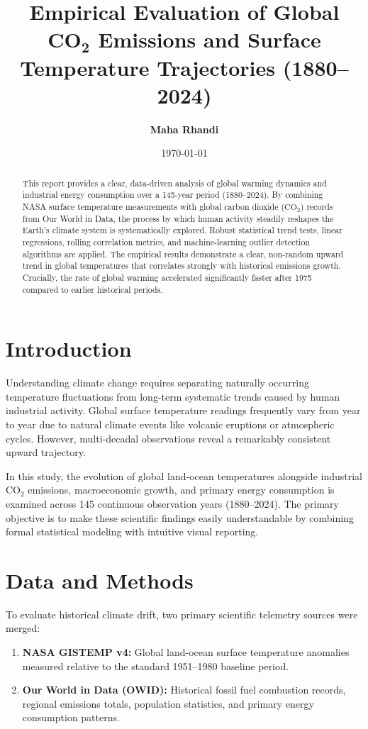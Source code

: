 \documentclass[10pt,twocolumn,3p]{article}
\title{\textbf{Empirical Evaluation of Global $\mathbf{CO_2}$ Emissions and Surface Temperature Trajectories (1880--2024)}}
\author{\textbf{Maha Rhandi}}
\date{\today}
\begin{document}
\maketitle

\begin{abstract}
This report provides a clear, data-driven analysis of global warming dynamics and industrial energy consumption over a 145-year period (1880--2024). By combining NASA surface temperature measurements with global carbon dioxide ($\mathrm{CO_2}$) records from Our World in Data, the process by which human activity steadily reshapes the Earth's climate system is systematically explored. Robust statistical trend tests, linear regressions, rolling correlation metrics, and machine-learning outlier detection algorithms are applied. The empirical results demonstrate a clear, non-random upward trend in global temperatures that correlates strongly with historical emissions growth. Crucially, the rate of global warming accelerated significantly faster after 1975 compared to earlier historical periods.
\end{abstract}

\section{Introduction}
Understanding climate change requires separating naturally occurring temperature fluctuations from long-term systematic trends caused by human industrial activity. Global surface temperature readings frequently vary from year to year due to natural climate events like volcanic eruptions or atmospheric cycles. However, multi-decadal observations reveal a remarkably consistent upward trajectory.

In this study, the evolution of global land-ocean temperatures alongside industrial $\mathrm{CO_2}$ emissions, macroeconomic growth, and primary energy consumption is examined across 145 continuous observation years (1880--2024). The primary objective is to make these scientific findings easily understandable by combining formal statistical modeling with intuitive visual reporting.

\section{Data and Methods}
To evaluate historical climate drift, two primary scientific telemetry sources were merged:
\begin{enumerate}
    \item \textbf{NASA GISTEMP v4:} Global land-ocean surface temperature anomalies measured relative to the standard 1951--1980 baseline period.
    \item \textbf{Our World in Data (OWID):} Historical fossil fuel combustion records, regional emissions totals, population statistics, and primary energy consumption patterns.
\end{enumerate}
\end{document}
